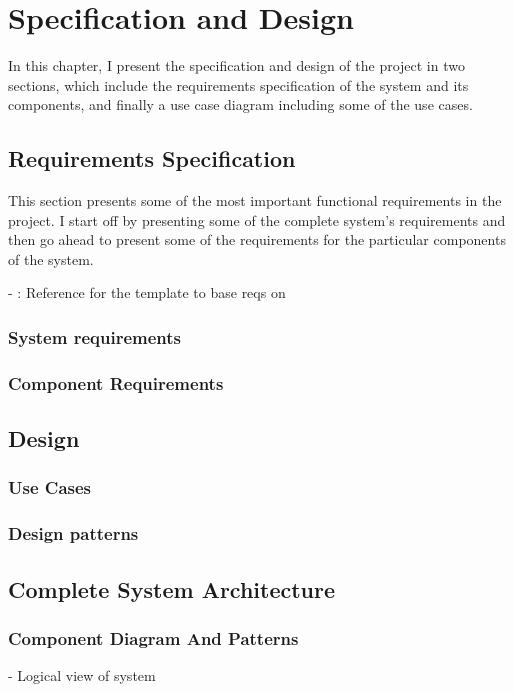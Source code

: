 \chapter{Specification and Design}\label{ch:mathtest} %
In this chapter, I present the specification and design of the project in two sections, which include the requirements specification of the system and its components, and finally a use case diagram including some of the use cases.

\section{Requirements Specification}
This section presents some of the most important functional requirements in the project. I start off by presenting some of the complete system's requirements and then go ahead to present some of the requirements for the particular components of the system.

- \cite{gomez2014cloud}: Reference for the template to base reqs on

\subsection{System requirements}


\subsection{Component Requirements}


\section{Design} %

\subsection{Use Cases}

\subsection{Design patterns}

\section{Complete System Architecture}
\subsection{Component Diagram And Patterns}
- Logical view of system

